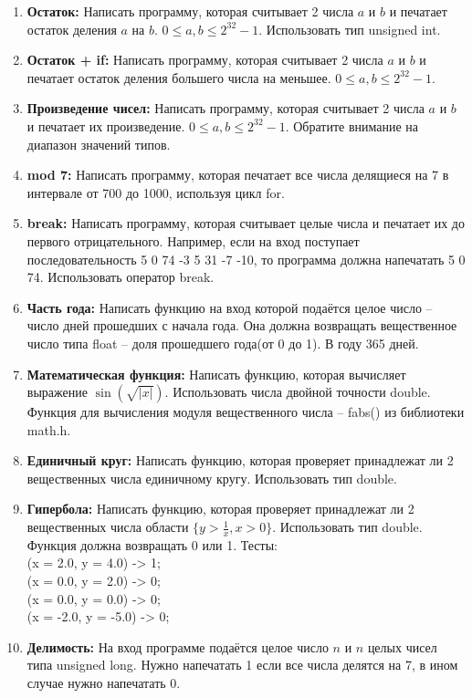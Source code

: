 \documentclass{article}
\begin{document}
\begin{enumerate}
\item \textbf{Остаток:} Написать программу, которая считывает 2 числа $a$ и $b$ и печатает остаток деления $a$ на $b$. $0 \le a, b \le 2^{32}-1$. Использовать тип unsigned int.
\item \textbf{Остаток + if:} Написать программу, которая считывает 2 числа $a$ и $b$ и печатает остаток деления большего числа на меньшее. $0 \le a, b \le 2^{32}-1$.
\item \textbf{Произведение чисел:} Написать программу, которая считывает 2 числа $a$ и $b$ и печатает их произведение. $0 \le a, b \le 2^{32}-1$. Обратите внимание на диапазон значений типов.
\item \textbf{mod 7:} Написать программу, которая печатает все числа делящиеся на 7 в интервале от 700 до 1000, используя цикл for.
\item \textbf{break:} Написать программу, которая считывает целые числа и печатает их до первого отрицательного. Например, если на вход поступает последовательность 5 0 74 -3 5 31 -7 -10, то программа должна напечатать 5 0 74. Использовать оператор break.
\item \textbf{Часть года:} Написать функцию на вход которой подаётся целое число -- число дней прошедших с начала года. Она должна возвращать вещественное число типа float -- доля прошедшего года(от 0 до 1). В году 365 дней.
\item \textbf{Математическая функция:} Написать функцию, которая вычисляет выражение $\sin(\sqrt{|x|})$. Использовать числа двойной точности double. Функция для вычисления модуля вещественного числа -- fabs() из библиотеки math.h. 
\item \textbf{Единичный круг:} Написать функцию, которая проверяет принадлежат ли 2 вещественных числа единичному кругу. Использовать тип double.
\item \textbf{Гипербола:} Написать функцию, которая проверяет принадлежат ли 2 вещественных числа области 
$\{y > \frac{1}{x}, x > 0\}$. Использовать тип double. Функция должна возвращать 0 или 1. Тесты: \\
(x = 2.0, y = 4.0) -> 1; \\
(x = 0.0, y = 2.0) -> 0; \\
(x = 0.0, y = 0.0) -> 0; \\
(x = -2.0, y = -5.0) -> 0;\\
\item \textbf{Делимость:} На вход программе подаётся целое число $n$ и $n$ целых чисел типа unsigned long. Нужно напечатать 1 если все числа делятся на 7, в ином случае нужно напечатать 0.

\end{enumerate}
\end{document}
